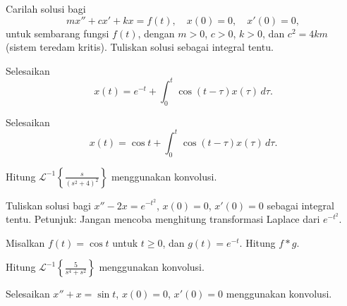 \begin{exercise}
Carilah solusi bagi
\begin{equation*}
m x'' + c x' + k x = f(t) , \quad x(0) = 0, \quad x'(0) = 0 ,
\end{equation*}
untuk sembarang fungsi $f(t)$, dengan $m > 0$, $c > 0$, $k > 0$,
dan $c^2 = 4km$ (sistem teredam kritis).
Tuliskan solusi sebagai integral tentu.
\end{exercise}

\begin{exercise}
Selesaikan
\begin{equation*}
x(t) =  e^{-t} + \int_0^t \cos(t-\tau) x(\tau) \, d\tau .
\end{equation*}
\end{exercise}

\begin{exercise}
Selesaikan
\begin{equation*}
x(t) =  \cos t + \int_0^t \cos(t-\tau) x(\tau) \, d\tau .
\end{equation*}
\end{exercise}

\begin{exercise}
Hitung ${\mathcal{L}}^{-1} \left\{ \frac{s}{{(s^2+4)}^2} \right\}$ menggunakan
konvolusi.
\end{exercise}

\begin{exercise}
Tuliskan solusi bagi
$x''-2x=e^{-t^2}$, $x(0)=0$, $x'(0)=0$ sebagai
integral tentu.  Petunjuk: Jangan mencoba menghitung
transformasi Laplace dari $e^{-t^2}$.
\end{exercise}

\setcounter{exercise}{100}

\begin{exercise}
Misalkan $f(t) = \cos t$ untuk $t \geq 0$, dan $g(t) = e^{-t}$.  Hitung
$f * g$.
\end{exercise}

\begin{exercise}
Hitung ${\mathcal{L}}^{-1} \left\{ \frac{5}{s^4+s^2} \right\}$ menggunakan
konvolusi.
\end{exercise}

\begin{exercise}
Selesaikan $x''+x = \sin t$, $x(0) = 0$, $x'(0)=0$ menggunakan konvolusi.
\end{exercise}

